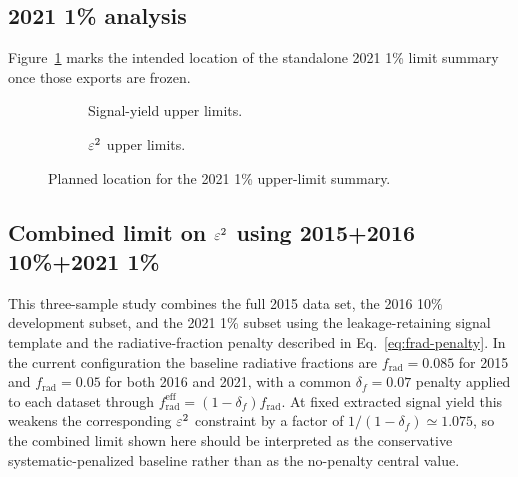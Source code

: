 
\subsection{2021 1\% analysis}
\label{sec:results-2021-1pct}


Figure~\ref{fig:results-2021-1pct-placeholder} marks the intended location of the
standalone 2021 1\% limit summary once those exports are frozen.

\begin{figure}[H]
\centering
\begin{subfigure}[t]{0.48\linewidth}
  \centering
  \caption{Signal-yield upper limits.}
\end{subfigure}
\hfill
\begin{subfigure}[t]{0.48\linewidth}
  \centering
  \caption{$\varepsilon^2$ upper limits.}
\end{subfigure}
\caption{Planned location for the 2021 1\% upper-limit summary.}
\label{fig:results-2021-1pct-placeholder}
\end{figure}

\subsection{Combined limit on \texorpdfstring{$\varepsilon^2$}{epsilon2} using 2015+2016 10\%+2021 1\%}
\label{sec:results-combined-151621-1pct}

This three-sample study combines the full 2015 data set, the 2016 10\% development
subset, and the 2021 1\% subset using the leakage-retaining signal template and the
radiative-fraction penalty described in Eq.~\eqref{eq:frad-penalty}. In the current
configuration the baseline radiative fractions are $f_{\mathrm{rad}}=0.085$ for 2015
and $f_{\mathrm{rad}}=0.05$ for both 2016 and 2021, with a common
$\delta_f=0.07$ penalty applied to each dataset through
$f_{\mathrm{rad}}^{\mathrm{eff}}=(1-\delta_f)f_{\mathrm{rad}}$. At fixed extracted
signal yield this weakens the corresponding $\varepsilon^2$ constraint by a factor of
$1/(1-\delta_f)\simeq 1.075$, so the combined limit shown here should be interpreted as
the conservative systematic-penalized baseline rather than as the no-penalty central
value.

